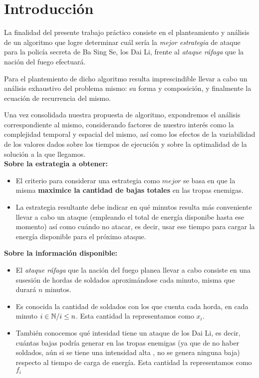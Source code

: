 \section{Introducción}

La finalidad del presente trabajo práctico consiste en el planteamiento y análisis de un algoritmo que logre determinar cuál sería la \textit{mejor estrategia} de ataque para la policía secreta de Ba Sing Se, los Dai Li, frente al \textit{ataque ráfaga} que la nación del fuego efectuará. 

Para el plantemiento de dicho algoritmo resulta imprescindible llevar a cabo un análisis exhaustivo del problema mismo: su forma y composición, y finalmente la ecuación de recurrencia del mismo. 

Una vez consolidada nuestra propuesta de algoritmo, expondremos el análisis correspondiente al mismo, considerando factores de nuestro interés como la complejidad temporal y espacial del mismo, así como los efectos de la variabilidad de los valores dados sobre los tiempos de ejecución y sobre la optimalidad de la solución a la que llegamos.\\



\textbf{Sobre la estrategia a obtener:}
{\setlength{\parindent}{25pt}
\begin{itemize}
    \item El criterio para considerar una estrategia como $mejor$ se basa en que la misma \textbf{maximice la cantidad de bajas totales} en las tropas enemigas.
    \item  La estrategia resultante debe indicar en qué minutos resulta más conveniente llevar a cabo un ataque (empleando el total de energía disponibe hasta ese momento) así como cuándo no atacar, es decir, usar ese tiempo para cargar la energía disponible para el próximo ataque.\\
\end{itemize}
}


\textbf{Sobre la información disponible:}
{\setlength{\parindent}{25pt}

\begin{itemize}
    \item El \textit{ataque ráfaga} que la nación del fuego planea llevar a cabo consiste en una susesión de hordas de soldados aproximándose cada minuto, misma que durará $n$ minutos.
    \item Es conocida la cantidad de soldados con los que cuenta cada horda, en cada minuto $i\in\mathbb{N}/ \\ i\leq n$. Esta cantidad la representamos como $x_i$.
    \item También conocemos qué intesidad tiene un ataque de los Dai Li, es decir, cuántas bajas podría generar en las tropas enemigas (ya que de no haber soldados, aún si se tiene una intensidad alta , no se genera ninguna baja) respecto al tiempo de carga de energía. Esta cantidad la representamos como $f_i$
\end{itemize}

}

